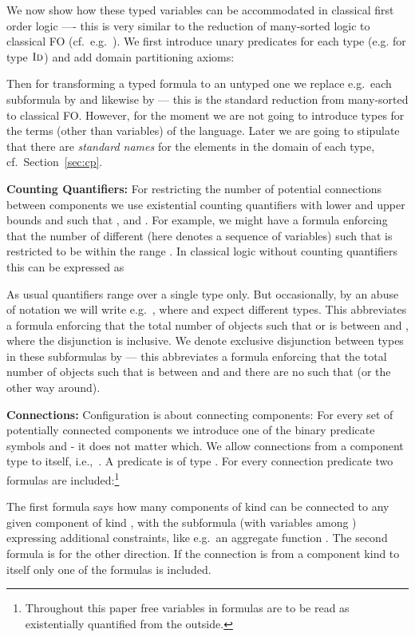 \documentclass[copyright,creativecommons]{eptcs}
\newcommand{\sort}[1]{\ensuremath{\text{\sc #1}}\xspace}
\begin{document}
We now show how these typed variables can be accommodated in classical first order logic ---- 
this is very similar to the reduction of many-sorted logic to classical FO (cf.\ e.g.\ \cite{Enderton}).
We first introduce unary predicates for each type (e.g.  for type \sort{Id}) and add domain partitioning axioms\/:



Then for transforming a typed formula to an untyped one we replace 
e.g.\ each subformula  by  and likewise  by  ---
this is the standard reduction from many-sorted to classical FO.
However, for the moment we are not going to introduce types for the terms (other than variables) of the language.
Later we are going to stipulate that there are {\em standard names} for the elements in the domain of each type, cf.\ Section~\ref{sec:cp}. 

{\noindent \bf Counting Quantifiers\/:}
For restricting the number of potential connections between components we use existential counting quantifiers  
with lower and upper bounds  and  such that ,  and . 
For example, we might have a formula  enforcing that the number of different  (here  denotes a sequence of variables) such that  is restricted to be within the range . 
In classical logic without counting quantifiers this can be expressed as



As usual quantifiers range over a single type only.
But occasionally, by an abuse of notation we will write e.g.\ , where  and  expect different types.
This abbreviates a formula enforcing that the total number of objects such that  or  is between  and , where the disjunction is inclusive.
We denote exclusive disjunction between types in these subformulas by  ---
this abbreviates a formula enforcing that the total number of objects such that  is between  and  and there are no  such that  (or the other way around).

{\noindent \bf Connections\/:} Configuration is about connecting components\/: For every set  of potentially connected
components we introduce one of the binary predicate symbols  and  - it does not matter which. 
We allow connections from a component type to itself, i.e.,\ .
A predicate  is of type .
For every connection predicate  two formulas are included\/:\footnote{Throughout this paper free variables in formulas are to be read as existentially quantified from the outside.}



The first formula says how many components of kind  can be connected to any given component of kind ,
with the subformula  (with variables among ) expressing additional constraints, 
like e.g.\ an aggregate function .
The second formula is for the other direction. 
If the connection is from a component kind to itself only one of the formulas is included.
\end{document}
